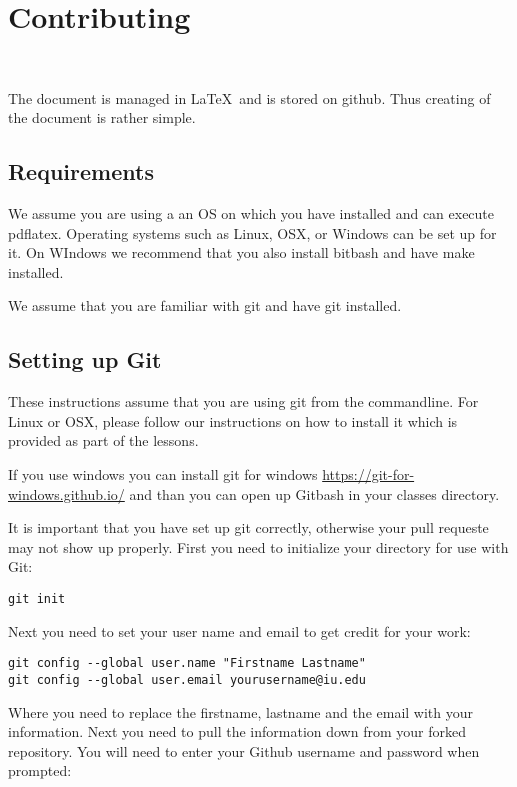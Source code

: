 

\section{Contributing}\label{S:contributing}

\FILENAME\

The document is managed in \LaTeX~and is stored on github. Thus
creating of the document is rather simple.

\subsection{Requirements}

We assume you are using a an OS on which you have installed and can
execute pdflatex. Operating systems such as Linux, OSX, or Windows can
be set up for it. On WIndows we recommend that you also install
bitbash and have  make installed.

We assume that you are familiar with git and have git installed.

\subsection{Setting up Git}

These instructions assume that you are using git from the commandline.
For Linux or OSX, please follow our instructions on how to install it
which is provided as part of the lessons.

If you use windows you can install
git for windows \url{https://git-for-windows.github.io/}
and than you can open up Gitbash in your classes directory.

It is important that you have set up git correctly, otherwise your
pull requeste may not show up properly.  First you need to initialize
your directory for use with Git:

\begin{verbatim}
git init
\end{verbatim}

Next you need to set your user name and email to get credit for your
work:

\begin{verbatim}
git config --global user.name "Firstname Lastname"
git config --global user.email yourusername@iu.edu
\end{verbatim}


Where you need to replace the firstname, lastname and the email with
your information. Next you need to pull the information down from your
forked repository.  You will need to enter your Github username and
password when prompted:



